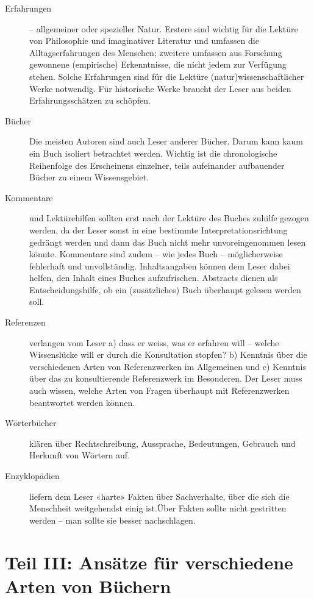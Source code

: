 \documentclass[a4paper,12pt]{scrartcl}
\begin{document}
\begin{description}
\item[Erfahrungen] – allgemeiner oder spezieller Natur. Erstere sind wichtig für die Lektüre von Philosophie und imaginativer Literatur und umfassen die Alltagserfahrungen des Menschen; zweitere umfassen aus Forschung gewonnene (empirische) Erkenntnisse, die nicht jedem zur Verfügung stehen. Solche Erfahrungen sind für die Lektüre (natur)wissenschaftlicher Werke notwendig. Für historische Werke braucht der Leser aus beiden Erfahrungsschätzen zu schöpfen.
\item[Bücher] Die meisten Autoren sind auch Leser anderer Bücher. Darum kann kaum ein Buch isoliert betrachtet werden. Wichtig ist die chronologische Reihenfolge des Erscheinens einzelner, teils aufeinander aufbauender Bücher zu einem Wissensgebiet.
\item[Kommentare] und Lektürehilfen sollten erst nach der Lektüre des Buches zuhilfe gezogen werden, da der Leser sonst in eine bestimmte Interpretationsrichtung gedrängt werden und dann das Buch nicht mehr unvoreingenommen lesen könnte. Kommentare sind zudem – wie jedes Buch – möglicherweise fehlerhaft und unvollständig. Inhaltsangaben können dem Leser dabei helfen, den Inhalt eines Buches aufzufrischen. Abstracts dienen als Entscheidungshilfe, ob ein (zusätzliches) Buch überhaupt gelesen werden soll.
\item[Referenzen] verlangen vom Leser a) dass er weiss, was er erfahren will – welche Wissenslücke will er durch die Konsultation stopfen? b) Kenntnis über die verschiedenen Arten von Referenzwerken im Allgemeinen und c) Kenntnis über das zu konsultierende Referenzwerk im Besonderen. Der Leser muss auch wissen, welche Arten von Fragen überhaupt mit Referenzwerken beantwortet werden können.
\item[Wörterbücher] klären über Rechtschreibung, Aussprache, Bedeutungen, Gebrauch und Herkunft von Wörtern auf.
\item[Enzyklopädien] liefern dem Leser «harte» Fakten über Sachverhalte, über die sich die Menschheit weitgehendst einig ist.Über Fakten sollte nicht gestritten werden – man sollte sie besser nachschlagen.
\end{description}

\newpage
\section*{Teil III: Ansätze für verschiedene Arten von Büchern}
\end{document}
